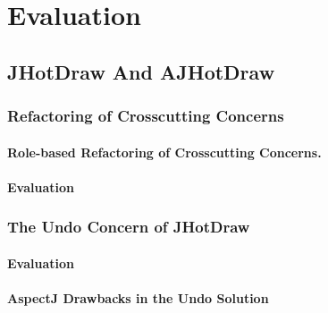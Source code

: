 \chapter{Evaluation}\label{Evaluation}

\section{JHotDraw And AJHotDraw}\label{JHotDraw And AJHotDraw}

\subsection{Refactoring of Crosscutting Concerns}

\subsubsection{Role-based Refactoring of Crosscutting Concerns.}

\subsubsection{Evaluation}

\subsection{The Undo Concern of JHotDraw}

\subsubsection{Evaluation}

\subsubsection{AspectJ Drawbacks in the Undo Solution}

